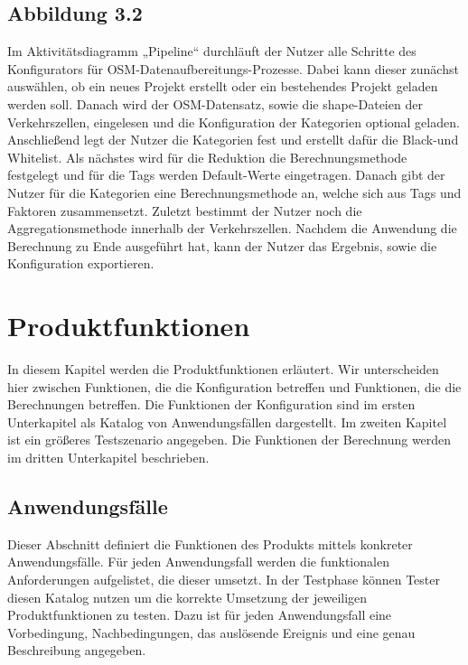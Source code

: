 \documentclass[parskip=full]{scrartcl} %
\begin{document}
\subsection*{Abbildung 3.2}
Im Aktivitätsdiagramm „Pipeline“ durchläuft der Nutzer alle Schritte des Konfigurators für OSM-Datenaufbereitungs-Prozesse. Dabei kann dieser zunächst auswählen, ob ein neues Projekt erstellt oder ein bestehendes Projekt geladen werden soll. Danach wird der OSM-Datensatz, sowie die shape-Dateien der Verkehrszellen, eingelesen und die Konfiguration der Kategorien optional geladen. Anschließend legt der Nutzer die Kategorien fest und erstellt dafür die Black-und Whitelist. Als nächstes wird für die Reduktion die Berechnungsmethode festgelegt und für die Tags werden Default-Werte eingetragen. Danach gibt der Nutzer für die Kategorien eine Berechnungsmethode an, welche sich aus Tags und Faktoren zusammensetzt. Zuletzt bestimmt der Nutzer noch die Aggregationsmethode innerhalb der Verkehrszellen. Nachdem die Anwendung die Berechnung zu Ende ausgeführt hat, kann der Nutzer das Ergebnis, sowie die Konfiguration exportieren. 

\newpage










\section{Produktfunktionen}
In diesem Kapitel werden die Produktfunktionen erläutert. Wir unterscheiden hier zwischen Funktionen, die die Konfiguration betreffen und Funktionen, die die Berechnungen betreffen. Die Funktionen der Konfiguration sind im ersten Unterkapitel als Katalog von Anwendungsfällen dargestellt. Im zweiten Kapitel ist ein größeres Testszenario angegeben. Die Funktionen der Berechnung werden im dritten Unterkapitel beschrieben.

\subsection{Anwendungsfälle}
Dieser Abschnitt definiert die Funktionen des Produkts mittels konkreter Anwendungsfälle. Für jeden Anwendungsfall werden die funktionalen Anforderungen aufgelistet, die dieser umsetzt. In der Testphase können Tester diesen Katalog nutzen um die korrekte Umsetzung der jeweiligen Produktfunktionen zu testen. Dazu ist für jeden Anwendungsfall eine Vorbedingung, Nachbedingungen, das auslösende Ereignis und eine genau Beschreibung angegeben.
\newpage
\end{document}
